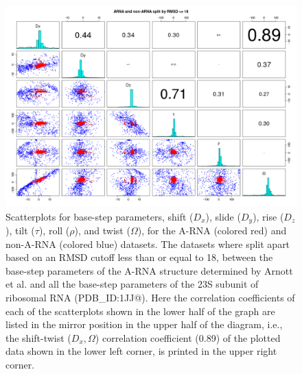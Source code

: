 \begin{figure}
 \centering
\includegraphics[angle=90, scale=0.48]{Chapter2/warna_step.png}
\caption{Scatterplots     for      base-step     parameters,     shift
  ($D_{x}$),  slide  ($D_{y}$),  rise  ($D_{z}$),
  tilt ($\tau$),  roll ($\rho$), and  twist ($\Omega$), for  the A-RNA
  (colored red)  and non-A-RNA  (colored blue) datasets.  The datasets
  where split apart based on an  RMSD cutoff less than or equal to 18,
  between the  base-step parameters of the  A-RNA structure determined
  by Arnott et al.  \cite{arnott1973} and all the base-step parameters
  of  the  23S subunit  of  ribosomal  RNA  (PDB\_ID:1JJ@).  Here  the
  correlation coefficients  of each of  the scatterplots shown  in the
  lower half  of the graph  are listed in  the mirror position  in the
  upper half  of the diagram, i.e., the  shift-twist ($D_{x}, \Omega$)
  correlation  coefficient (0.89)  of the  plotted data  shown  in the
  lower left corner, is printed in the upper right corner.}
\label{fig:allsteps}
\end{figure}

